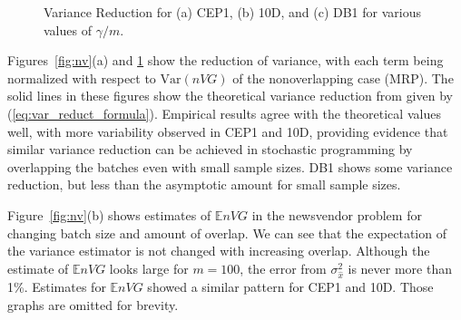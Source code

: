 \documentclass[12pt]{article}
\newcommand{\e}[1]{\mathbb{E} %
#1 %
}
\newcommand{\var}[1]{\mathrm{Var} \left( #1 \right)}
\newcommand{\x}{x}
\newcommand{\xh}{{\hat{\x}}}
\begin{document}
\begin{figure}[htb!]
	\centering
		\caption{
		Variance Reduction for
		(a) CEP1,
		(b) 10D, and
		(c) DB1
		for various values of $\gamma / m$.
		}
\label{fig:varvar}
\end{figure}


Figures~\ref{fig:nv}(a) and \ref{fig:varvar} show the reduction of variance, with each term being normalized with respect to $\var{nVG}$ of the nonoverlapping case (MRP). 
The solid lines in these figures show the theoretical variance reduction from \citep{Welch1987} given by (\ref{eq:var_reduct_formula}). 
Empirical results agree with the theoretical values well, with more variability observed in CEP1 and 10D, providing evidence that similar variance reduction can be achieved in stochastic programming by overlapping the batches even with small sample sizes.
DB1 shows some variance reduction, but less than the asymptotic amount for small sample sizes.

Figure~\ref{fig:nv}(b) shows estimates of $\e{nVG}$ in the newsvendor problem for changing batch size and amount of overlap. 
We can see that the expectation of the variance estimator is not changed with increasing overlap. 
Although the estimate of $\e{nVG}$ looks large for $m=100$, the error from $\sigma^2_\xh$ is never more than 1\%.  
Estimates for $\e{nVG}$ showed a similar pattern for CEP1 and 10D.  Those graphs are omitted for brevity.
\end{document}
